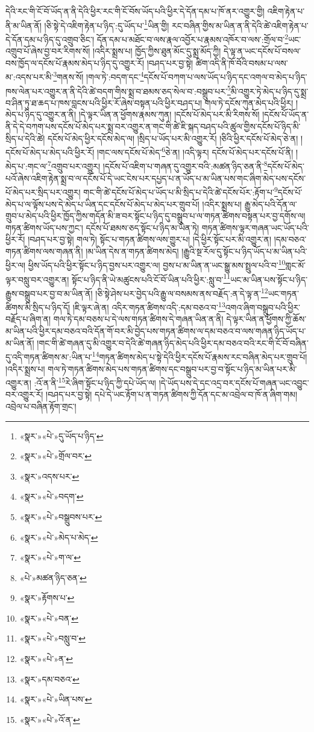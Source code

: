 དེའི་རང་གི་ངོ་བོ་ཡོད་ན་ནི་དེའི་ཕྱིར་རང་གི་ངོ་བོས་ཡོད་པའི་ཕྱིར་དེ་དོན་དམ་པ་ཁོ་ནར་འགྱུར་གྱི། འཇིག་རྟེན་པ་ནི་མ་ཡིན་ནོ། །ཅི་སྟེ་དེ་འཇིག་རྟེན་པ་ཉིད་:དུ་ཡོད་པ་\footnote{«སྣར་»«པེ་»དུ་ཡོད་པ་ཉིད་}ཡིན་གྱི། རང་བཞིན་གྱིས་མ་ཡིན་ན་ནི་དེའི་ཚེ་འཇིག་རྟེན་པ་དེ་དོན་དམ་པ་ཉིད་དུ་འགྲུབ་ཅིང་། དོན་དམ་པ་མཐོང་བ་ལས་རྣལ་འབྱོར་པ་རྣམས་འཁོར་བ་ལས་:གྲོལ་བ་\footnote{«སྣར་»«པེ་»གྲོལ་བར་}ཡང་འགྲུབ་པོ་ཞེས་བྱ་བར་རིགས་སོ། །འདིར་སྨྲས་པ། ཁྱོད་ཀྱིས་ཐུན་མོང་དུ་སྨྲ་མོད་ཀྱི། དེ་ལྟ་ན་ཡང་དངོས་པོ་བསལ་བས་ཁྱོད་ལ་དངོས་པོ་རྣམས་མེད་པ་ཉིད་དུ་འགྱུར་རོ། །བཤད་པར་བྱ་སྟེ། ཚིག་འདི་ནི་ཁོ་བོའི་བསམ་པ་ལས་མ་:འདས་པར་མི་\footnote{«སྣར་»འདས་པར་}གནས་སོ། །གལ་ཏེ་:བདག་དང་\footnote{«སྣར་»«པེ་»བདག་}དངོས་པོ་བཀག་པ་ལས་ཡོད་པ་ཉིད་དང་འགལ་བ་མེད་པ་ཉིད་ཁས་ལེན་པར་འགྱུར་ན་ནི་དེའི་ཚེ་བདག་གིས་སྨྲ་བ་ཐམས་ཅད་སེལ་བ་:བསྒྲུབ་པར་\footnote{«སྣར་»«པེ་»བསྒྲུབས་པར་}མི་འགྱུར་ཏེ་མེད་པ་ཉིད་དུ་སྨྲ་བ་ཤིན་ཏུ་ཐ་ཆད་པ་ཁས་བླངས་པའི་ཕྱིར་རོ་ཞེས་བསྟན་པའི་ཕྱིར་བཤད་པ། གལ་ཏེ་དངོས་ཀུན་མེད་པའི་ཕྱིར། །མེད་པ་ཉིད་དུ་འགྱུར་ན་ནི། །དེ་ལྟར་ཡིན་ན་ཕྱོགས་རྣམས་ཀུན། །དངོས་པོ་མེད་པར་མི་རིགས་སོ། །དངོས་པོ་ཡོད་ན་ནི་དེ་དེ་བཀག་པས་དངོས་པོ་མེད་པར་སྨྲ་བར་འགྱུར་ན་གང་གི་ཚེ་ཇི་སྐད་བཤད་པའི་ཚུལ་གྱིས་དངོས་པོ་ཉིད་མི་སྲིད་པ་དེའི་ཚེ། དངོས་པོ་མེད་ཕྱིར་དངོས་མེད་ལ། །སྲིད་པ་ཡོད་པར་མི་འགྱུར་རོ། །ཅིའི་ཕྱིར་དངོས་པོ་མེད་ཅེ་ན། །དངོས་པོ་མེད་པ་མེད་པའི་ཕྱིར་རོ། །གང་ལས་དངོས་པོ་མེད་\footnote{«སྣར་»«པེ་»མེད་པ་མེད་}ཅེ་ན། །འདི་ལྟར། དངོས་པོ་མེད་པར་དངོས་པོ་ནི། །མེད་པ་:གང་ལ་\footnote{«སྣར་»«པེ་»ག་ལ་}འགྲུབ་པར་འགྱུར། །དངོས་པོ་འཇིག་པ་གཞན་དུ་འགྱུར་བའི་:མཚན་ཉིད་ཅན་ནི་\footnote{«པེ་»མཚན་ཉིད་ཅན་}དངོས་པོ་མེད་པའོ་ཞེས་འཇིག་རྟེན་སྨྲ་བ་ལ་དངོས་པོ་དེ་ཡང་ངེས་པར་དཔྱད་པ་ན་ཡོད་པ་མ་ཡིན་པས་གང་ཞིག་མེད་པས་དངོས་པོ་མེད་པར་སྲིད་པར་འགྱུར། གང་གི་ཚེ་དངོས་པོ་མེད་པ་ཡོད་པ་མི་སྲིད་པ་དེའི་ཚེ་དངོས་པོར་:རྟོག་པ་\footnote{«སྣར་»རྟོགས་པ་}དངོས་པོ་མེད་པ་ལ་ལྟོས་པས་དེ་མེད་པ་ཡིན་དང་དངོས་པོ་མེད་པ་མེད་པར་གྲུབ་པོ། །འདིར་སྨྲས་པ། རྒྱུ་མེད་པའི་དོན་ལ་གྲུབ་པ་མེད་པའི་ཕྱིར་ཁྱོད་ཀྱིས་གདོན་མི་ཟ་བར་སྟོང་པ་ཉིད་དུ་བསྒྲུབ་པ་ལ་གཏན་ཚིགས་བསྟན་པར་བྱ་དགོས་ལ། གཏན་ཚིགས་ཡོད་པས་ཀྱང་། དངོས་པོ་ཐམས་ཅད་སྟོང་པ་ཉིད་མ་ཡིན་ཏེ། གཏན་ཚིགས་ལྟར་གཞན་ཡང་ཡོད་པའི་ཕྱིར་རོ། །བཤད་པར་བྱ་སྟེ། གལ་ཏེ། སྟོང་པ་གཏན་ཚིགས་ལས་གྱུར་པ། །དེ་ཕྱིར་སྟོང་པར་མི་འགྱུར་ན། །དམ་བཅའ་གཏན་ཚིགས་ལས་གཞན་ནི། །མ་ཡིན་དེས་ན་གཏན་ཚིགས་མེད། །རྒྱུའི་སྔ་རོལ་དུ་སྟོང་པ་ཉིད་ཡོད་པ་མ་ཡིན་པའི་ཕྱིར་ལ། ཕྱིས་ཡོད་པའི་ཕྱིར་སྟོང་པ་ཉིད་བྱས་པར་འགྱུར་ལ། བྱས་པ་མ་ཡིན་ན་ཡང་སྒྱུ་མས་སྤྲུལ་པའི་བ་\footnote{«སྣར་»«པེ་»བན་}གླང་མོ་ལྟར་བསླུ་བར་འགྱུར་ན། སྟོང་པ་ཉིད་ནི་ཡེ་མཚུངས་པའི་ངོ་བོ་ཡིན་པའི་ཕྱིར་:སླུ་བ་\footnote{«སྣར་»«པེ་»བསླུ་བ་}ཡང་མ་ཡིན་པས་སྟོང་པ་ཉིད་རྒྱུས་བསྒྲུབ་པར་བྱ་བ་མ་ཡིན་ནོ། །ཅི་སྟེ་ཤེས་པར་བྱེད་པའི་རྒྱུ་ལ་བསམས་ནས་བརྗོད་:ན་དེ་ལྟ་ན་\footnote{«སྣར་»«པེ་»ན་}ཡང་གཏན་ཚིགས་མི་སྲིད་པ་ཉིད་དོ། །ཇི་ལྟར་ཞེ་ན། འདིར་གཏན་ཚིགས་འདི་:དམ་བཅའ་བ་\footnote{«སྣར་»དམ་བཅའ་}འགའ་ཞིག་བསྒྲུབ་པའི་ཕྱིར་བརྗོད་པ་ཞིག་ན། གལ་ཏེ་དམ་བཅས་པ་དེ་ལས་གཏན་ཚིགས་དེ་གཞན་ཡིན་ན་ནི། དེ་ལྟར་ཡིན་ན་ཕྱོགས་ཀྱི་ཆོས་མ་ཡིན་པའི་ཕྱིར་དམ་བཅའ་བའི་དོན་གོ་བར་མི་བྱེད་པས་གཏན་ཚིགས་ལ་དམ་བཅའ་བ་ལས་གཞན་ཉིད་ཡོད་པ་མ་ཡིན་ནོ། །གང་གི་ཚེ་གཞན་དུ་མི་འགྱུར་བ་དེའི་ཚེ་གཞན་ཉིད་མེད་པའི་ཕྱིར་དམ་བཅའ་བའི་རང་གི་ངོ་བོ་བཞིན་དུ་འདི་གཏན་ཚིགས་མ་:ཡིན་པ་\footnote{«སྣར་»«པེ་»ཡིན་པས་}གཏན་ཚིགས་མེད་པ་སྟེ་དེའི་ཕྱིར་དངོས་པོ་རྣམས་རང་བཞིན་མེད་པར་གྲུབ་པོ། །འདིར་སྨྲས་པ། གལ་ཏེ་གཏན་ཚིགས་མེད་པས་གཏན་ཚིགས་དང་བསྒྲུབ་པར་བྱ་བ་སྟོང་པ་ཉིད་མ་ཡིན་པར་མི་འགྱུར་ན། :འོ་ན་ནི་\footnote{«སྣར་»«པེ་»འོ་ན་}རེ་ཞིག་སྟོང་པ་ཉིད་ཀྱི་དཔེ་ཡོད་ལ། །དེ་ཡོད་པས་དེ་དང་འདྲ་བར་དངོས་པོ་གཞན་ཡང་འབྱུང་བར་འགྱུར་རོ། །བཤད་པར་བྱ་སྟེ། དཔེ་དེ་ཡང་རྟོག་པ་ན་གཏན་ཚིགས་ཀྱི་དོན་དང་མ་འབྲེལ་བ་ཁོ་ན་ཞིག་གམ། འབྲེལ་པ་བཞིན་རྟོག་གྲང་། 